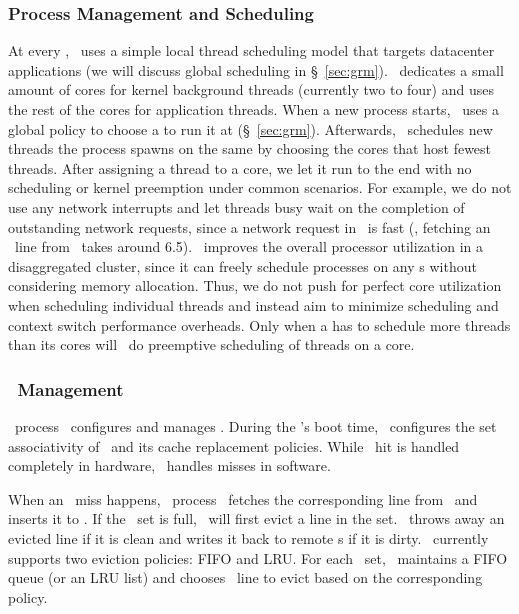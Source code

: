 \documentclass[10pt,times,twocolumn]{z2-article}
\begin{document}
{{{{{{{\subsubsection{Process Management and Scheduling}
\label{sec:proc-scheduling}
At every \pcomponent, \lego\ uses a simple local thread scheduling model 
that targets datacenter applications 
(we will discuss global scheduling in \S~\ref{sec:grm}).
\lego\ dedicates a small amount of cores for kernel background threads 
(currently two to four)
and uses the rest of the cores for application threads.
When a new process starts, \lego\ uses a global policy to choose a \pcomponent{} to run it at (\S~\ref{sec:grm}).
Afterwards, \lego\ schedules new threads the process spawns on the same \pcomponent{} 
by choosing the cores that host fewest threads.
After assigning a thread to a core, 
we let it run to the end with no scheduling or kernel preemption under common scenarios.
For example, we do not use any network interrupts 
and let threads busy wait on the completion of outstanding network requests, 
since a network request in \lego\ is fast 
(\eg, fetching an \excache\ line from \mcomponent\ takes around 6.5\mus).
\lego\ improves the overall processor utilization in a disaggregated cluster,
since it can freely schedule processes on any \pcomponent{}s without considering memory allocation.
Thus, we do not push for perfect core utilization when scheduling individual threads
and instead aim to minimize scheduling and context switch performance overheads.
Only when a \pcomponent{} has to schedule %
more threads than its cores will
\lego\ do preemptive scheduling of threads on a core.

\subsubsection{\excache\ Management}
\label{sec:excachemgmt}
\lego\ process \microos\ configures and manages \excache.
During the \pcomponent{}'s boot time, \lego\ configures the set associativity of \excache\
and its cache replacement policies.
While \excache\ hit is handled completely in hardware, 
\lego\ handles misses in software.

When an \excache\ miss happens, 
\lego\ process \microos\ fetches the corresponding line from \mcomponent\ and inserts it to \excache.
If the \excache\ set is full, \lego\ will first evict a line in the set.
\lego\ throws away an evicted line if it is clean
and writes it back to remote \mcomponent{}s if it is dirty.
\lego\ currently supports two eviction policies: FIFO and LRU.
For each \excache\ set, \lego\ maintains a FIFO queue (or an LRU list)
and chooses \excache\ line to evict based on the corresponding policy.

}}}}}}}
\end{document}
